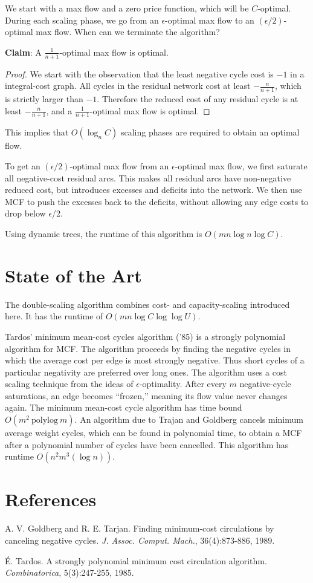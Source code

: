 \documentclass{article}
\begin{document}
We start with a max flow and a zero price function, which will be
$C$-optimal.  During each scaling phase, we go from an $\epsilon$-optimal max
flow to an $(\epsilon/2)$-optimal max flow.  When can we terminate the
algorithm?

\textbf{Claim}:
A $\frac{1}{n+1}$-optimal max flow is optimal.

\begin{proof}
We start with the observation that the least negative cycle cost is
$-1$ in a integral-cost graph.  All cycles in the residual network
cost at least $-\frac{n}{n+1}$, which is strictly larger than $-1$.
Therefore the reduced cost of any residual cycle is at least
$-\frac{n}{n+1}$, and a $\frac{1}{n+1}$-optimal max flow is optimal.
\end{proof}

This implies that $O(\log_{n}C)$ scaling phases are required to obtain an
optimal flow.

To get an $(\epsilon/2)$-optimal max flow from an $\epsilon$-optimal
max flow, we first saturate all negative-cost residual arcs.  This
makes all residual arcs have non-negative reduced cost, but introduces
excesses and deficits into the network.  We then use MCF to push the
excesses back to the deficits, without allowing any edge costs to drop
below $\epsilon$/2.

Using dynamic trees, the runtime of this algorithm is $O(mn \log n \log C)$.

\section{State of the Art}

The double-scaling algorithm combines cost- and capacity-scaling
introduced here.  It has the runtime of $O(mn \log C \log \log U)$.

Tardos' minimum mean-cost cycles algorithm ('85) is a strongly
polynomial algorithm for MCF.  The algorithm proceeds by finding the
negative cycles in which the average cost per edge is most strongly
negative.  Thus short cycles of a particular negativity are preferred
over long ones.  The algorithm uses a cost scaling technique from the
ideas of $\epsilon$-optimality.  After every $m$ negative-cycle
saturations, an edge becomes ``frozen,'' meaning its flow value never
changes again.  The minimum mean-cost cycle algorithm has time bound
$O(m^2\ \textrm{polylog}\ m)$.  An algorithm due to Trajan and Goldberg
cancels minimum average weight cycles, which can be found in polynomial
time, to obtain a MCF after a polynomial number of cycles have been
cancelled.  This algorithm has runtime $O(n^{2}m^{3}(\log n))$.


\section{References}

A. V. Goldberg and R. E. Tarjan. Finding minimum-cost circulations by canceling
negative cycles.
       \textit{J. Assoc. Comput. Mach.}, 36(4):873-886, 1989.

\'E. Tardos. A strongly polynomial minimum cost circulation algorithm.
\textit{Combinatorica}, 5(3):247-255, 1985.
\end{document}
